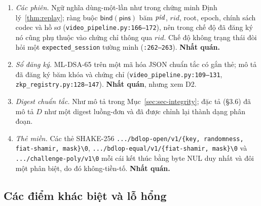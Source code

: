 \begin{enumerate}
  (\texttt{video\_proof.py:142--153}); phiên trong header phải bằng phiên của
  phát biểu (\texttt{:183}). Đã đăng ký: \texttt{ZKLR}, chỉ header và chứng
  minh, cam kết đã ghim (\texttt{:218--244}). \textbf{Nhất quán} với \S3.7.
\item \emph{Các phiên.} Ngữ nghĩa dùng-một-lần như trong chứng minh
  Định lý~\ref{thm:replay}; ràng buộc $\mathsf{bind}(\mathsf{pins})$ băm
  $\mathit{pid}$, $\mathit{rid}$, root, epoch, chính sách codec và hồ sơ
  (\texttt{video\_pipeline.py:166--172}), nên trong chế độ đã đăng ký nó cũng
  phụ thuộc vào chứng chỉ thông qua $\mathit{rid}$. Chế độ không trạng thái đòi
  hỏi một \texttt{expected\_session} tường minh (\texttt{:262--263}).
  \textbf{Nhất quán.}
\item \emph{Sổ đăng ký.} ML-DSA-65 trên một mã hóa JSON chuẩn tắc có gắn thẻ;
  mô tả đã đăng ký băm khóa và chứng chỉ
  (\texttt{video\_pipeline.py:109--131}, \texttt{zkp\_registry.py:128--147}).
  \textbf{Nhất quán}, nhưng xem D2.
\item \emph{Digest chuẩn tắc.} Như mô tả trong
  Mục~\ref{sec:sec-integrity}; đặc tả (\S3.6) đã mô tả $D$ như một digest
  luồng-đơn và đã được chỉnh lại thành dạng phân đoạn.
\item \emph{Thẻ miền.} Các thẻ SHAKE-256 \texttt{.../bdlop-open/v1/\{key,
  randomness, fiat-shamir, mask\}\textbackslash0},
  \texttt{.../bdlop-equal/v1/\{fiat-shamir, mask\}\textbackslash0} và
  \texttt{.../challenge-poly/v1\textbackslash0} mỗi cái kết thúc bằng byte NUL
  duy nhất và đôi một phân biệt, do đó không-tiền-tố. \textbf{Nhất quán.}
\end{enumerate}

\subsection{Các điểm khác biệt và lỗ hổng}

